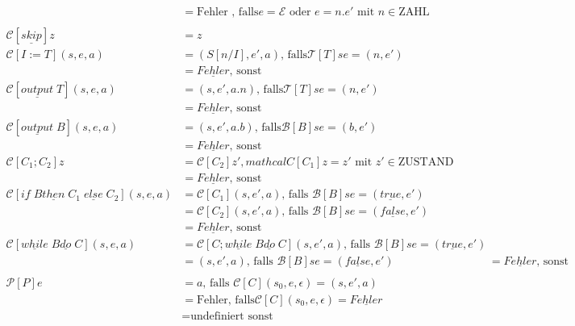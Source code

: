 \begin{compactitem}
\begin{compactitem}
\begin{align*}
		&= \text{Fehler , falls} e = \mathcal{E} \text{ oder } e = n.e' \text{ mit } n \in \text{ZAHL}\\
		\\
		\mathcal{C}[\underline{skip}] z &= z\\
		\mathcal{C}[I:=T] (s,e,a) &= (S[n/I], e', a)\text{, falls} \mathcal{T}[T] s e = (n, e')\\
		&= \underline{Fehler}\text{, sonst}\\
		\mathcal{C}[\underline{output}\;T] (s,e,a) &= (s,e',a.n)\text{, falls} \mathcal{T}[T]s e = (n,e')\\
		&= \underline{Fehler}\text{, sonst}\\
		\mathcal{C}[\underline{output}\;B] (s,e,a) &= (s,e',a.b)\text{, falls} \mathcal{B}[B]s e = (b,e')\\
		&= \underline{Fehler}\text{, sonst}\\
		\mathcal{C}[C_1;C_2] z &= \mathcal{C} [C_2] z', mathcal{C} [C_1] z = z' \text{ mit } z' \in \text{ZUSTAND}\\
		&= \underline{Fehler}\text{, sonst}\\
		\mathcal{C}[\underline{if}\;B \underline{then}\;C_1\;\underline{else}\;C_2] (s,e,a) &= \mathcal{C} [C_1] (s,e',a) \text{, falls } \mathcal{B}[B] s e = (\underline{true}, e')\\
		&= \mathcal{C} [C_2] (s,e',a) \text{, falls } \mathcal{B}[B] s e = (\underline{false}, e')\\
		&= \underline{Fehler}\text{, sonst}\\
		\mathcal{C}[\underline{while}\;B \underline{do}\;C] (s,e,a) &= \mathcal{C}[C;\underline{while}\;B \underline{do}\;C](s,e',a)\text{, falls }\mathcal{B}[B]s e = (\underline{true}, e')\\
		&= (s,e',a)\text{, falls }\mathcal{B}[B]s e = (\underline{false}, e')
		&= \underline{Fehler}\text{, sonst}\\
		\\
		\mathcal{P}[P]e &= a\text{, falls } \mathcal{C}[C](s_0,e,\epsilon) = (s, e', a) \\
		&= \text{Fehler, falls} \mathcal{C}[C](s_0,e,\epsilon) = \underline{Fehler}\\
		&= \text{undefiniert sonst}
		\end{align*}
	\end{compactitem}
\end{compactitem}